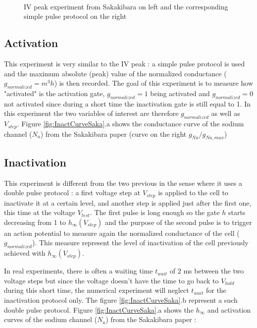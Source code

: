 \documentclass[11pt]{report}
\begin{document}
\begin{figure}[H]
    ~
    \caption{IV peak experiment from Sakakibara \cite{Sakakibara1992} on left and the corresponding simple pulse protocol on the right}
    \label{fig:IVexpSaka}
\end{figure}


\subsection{Activation}

This experiment is very similar to the IV peak : a simple pulse protocol is used and the maximum absolute (peak) value of the normalized conductance ($g_{normalized} = m^3h$) is then recorded. The goal of this experiment is to measure how "activated" is the activation gate, $g_{normalized} = 1$ being activated and $g_{normalized} = 0$ not activated since during a short time the inactivation gate is still equal to 1. In this experiment the two variables of interest are therefore $g_{normalized}$ as well as $V_{step}$. Figure \ref{fig:InactCurveSaka}.a shows the conductance curve of the sodium channel ($N_{a}$) from the Sakakibara \cite{Sakakibara1992} paper (curve on the right $g_{Na}/g_{Na,max}$)

\subsection{Inactivation}

This experiment is different from the two previous in the sense where it uses a double pulse protocol : a first voltage step at $V_{step}$ is applied to the cell to inactivate it at a certain level, and another step is applied just after the first one, this time at the voltage $V_{test}$. The first pulse is long enough so the gate $h$ starts decreasing from 1 to $h_{\infty}(V_{step})$ and the purpose of the second pulse is to trigger an action potential to measure again the normalized conductance of the cell ($g_{normalized}$). This measure represent the level of inactivation of the cell previously achieved with $h_{\infty}(V_{step})$.

In real experiments, there is often a waiting time $t_{wait}$ of $2$ ms between the two voltage steps but since the voltage doesn't have the time to go back to $V_{hold}$ during this short time, the numerical experiment will neglect $t_{wait}$ for the inactivation protocol only. The figure \ref{fig:InactCurveSaka}.b represent a such double pulse protocol. Figure \ref{fig:InactCurveSaka}.a shows the $h_{\infty}$ and activation curves of the sodium channel ($N_{a}$) from the Sakakibara \cite{Sakakibara1992} paper :
\end{document}
